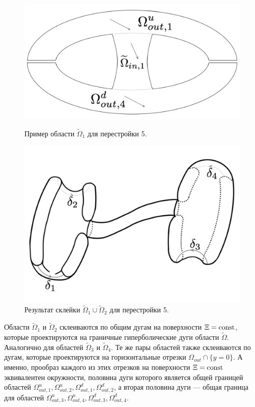 \begin{figure}[!htb]
\centering
\includegraphics[scale=0.1]{images/ch4/section2/atoms/atom_5_domain.pdf}
    \caption{Пример области $\widetilde{\Omega}_1$ для перестройки 5.}
    \label{fig:pt9:_domain_atom_hyp_foc}
\endminipage\hfill
{}
\centering
\includegraphics[scale=0.12]{images/ch4/section2/atoms/atom_5_half.pdf}
    \caption{Результат склейки $\widetilde{\Omega}_1 \cup \widetilde{\Omega}_2$ для перестройки 5.}
    \label{fig:pt9:_atom_5_half}
\endminipage\hfill
\end{figure}

Области $\widetilde{\Omega}_1$ и $\widetilde{\Omega}_2$ склеиваются по общим дугам на поверхности $\Xi = \mathrm{const}$, которые проектируются на граничные гиперболические дуги области $\widetilde{\Omega}$. Аналогично для областей $\widetilde{\Omega}_3$ и $\widetilde{\Omega}_4$. 
Те же пары областей также склеиваются по дугам, которые проектируются на горизонтальные отрезки $\Omega_{out} \cap \{y=0\}$. А именно, прообраз каждого из этих отрезков на поверхности $\Xi = \mathrm{const}$ эквивалентен окружности, половина дуги которого является общей границей областей $\Omega_{out, 1}^u, \Omega_{out, 2}^u, \Omega_{out, 1}^d, \Omega_{out, 2}^d$, а вторая половина дуги --- общая граница для областей $\Omega_{out, 3}^u, \Omega_{out, 4}^u, \Omega_{out, 3}^d, \Omega_{out, 4}^d$. 

